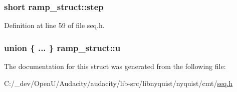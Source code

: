 \subsubsection[{\texorpdfstring{step}{step}}]{\setlength{\rightskip}{0pt plus 5cm}short ramp\+\_\+struct\+::step}\hypertarget{structramp__struct_a3e2627ae5c7347c6608db6f82635bcbd}{}\label{structramp__struct_a3e2627ae5c7347c6608db6f82635bcbd}


Definition at line 59 of file seq.\+h.

\subsubsection[{\texorpdfstring{u}{u}}]{\setlength{\rightskip}{0pt plus 5cm}union \{ ... \}   ramp\+\_\+struct\+::u}\hypertarget{structramp__struct_aeeb84f4d693d474dbd326781d42a8537}{}\label{structramp__struct_aeeb84f4d693d474dbd326781d42a8537}


The documentation for this struct was generated from the following file\+:\begin{DoxyCompactItemize}
\item 
C\+:/\+\_\+dev/\+Open\+U/\+Audacity/audacity/lib-\/src/libnyquist/nyquist/cmt/\hyperlink{seq_8h}{seq.\+h}\end{DoxyCompactItemize}
